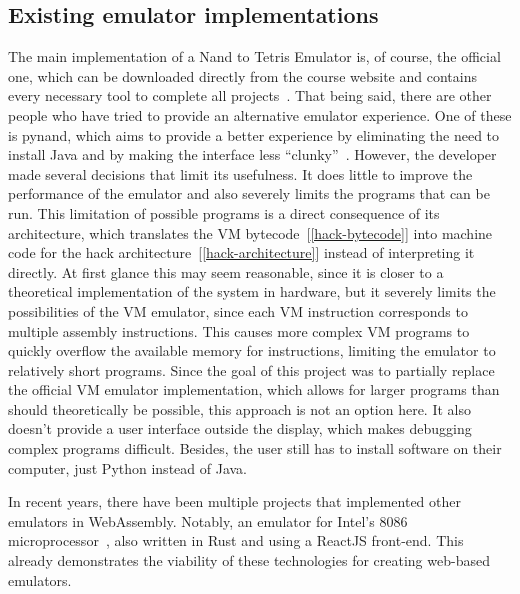 \subsection{Existing emulator implementations}
The main implementation of a Nand to Tetris Emulator is, of course, the official one, which can be downloaded directly from the course website and contains every necessary tool to complete all projects~\cite[Software]{n2tweb}.
\label{pynand}
That being said, there are other people who have tried to provide an alternative emulator experience.
One of these is pynand, which aims to provide a better experience by eliminating the need to install Java and by making the interface less ``clunky''~\cite{pynand}.
However, the developer made several decisions that limit its usefulness.
It does little to improve the performance of the emulator and also severely limits the programs that can be run.
This limitation of possible programs is a direct consequence of its architecture, which translates the VM bytecode~[\ref{hack-bytecode}] into machine code for the hack architecture~[\ref{hack-architecture}] instead of interpreting it directly.
At first glance this may seem reasonable, since it is closer to a theoretical implementation of the system in hardware, but it severely limits the possibilities of the VM emulator, since each VM instruction corresponds to multiple assembly instructions.
This causes more complex VM programs to quickly overflow the available memory for instructions, limiting the emulator to relatively short programs.
Since the goal of this project was to partially replace the official VM emulator implementation, which allows for larger programs than should theoretically be possible, this approach is not an option here.
It also doesn't provide a user interface outside the display, which makes debugging complex programs difficult.
Besides, the user still has to install software on their computer, just Python instead of Java.


In recent years, there have been multiple projects that implemented other emulators in WebAssembly. Notably, an emulator for Intel's 8086 microprocessor~\cite{9824078}, also written in Rust and using a ReactJS front-end. This already demonstrates the viability of these technologies for creating web-based emulators.

